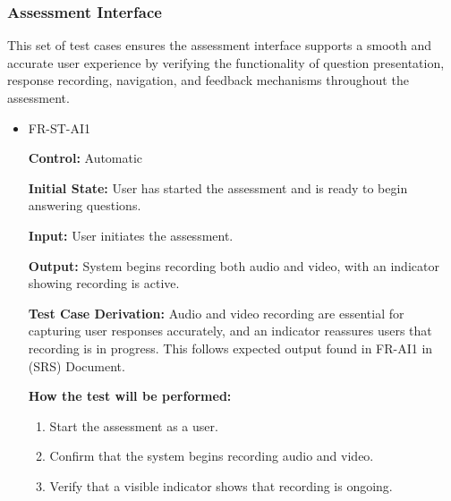 \documentclass[12pt, titlepage]{article}
\begin{document}
\subsubsection{Assessment Interface}

\hspace{2em}This set of test cases ensures the assessment interface supports a smooth and accurate user experience by verifying the 
functionality of question presentation, response recording, navigation, and feedback mechanisms throughout the assessment.

\begin{itemize}
  \item FR-ST-AI1
    \begin{mdframed}[linewidth=0.5mm]
      \textbf{Control:} Automatic \par
      \textbf{Initial State:} User has started the assessment and is ready to begin answering questions. \par
      \textbf{Input:} User initiates the assessment. \par
      \textbf{Output:} System begins recording both audio and video, with an indicator showing recording is active. \par
      \textbf{Test Case Derivation:} Audio and video recording are essential for capturing user responses accurately,
       and an indicator reassures users that recording is in progress. This follows expected output found in FR-AI1 in (SRS) Document. \par
      \textbf{How the test will be performed:}
      \begin{enumerate}[noitemsep]
        \item Start the assessment as a user.
        \item Confirm that the system begins recording audio and video.
        \item Verify that a visible indicator shows that recording is ongoing.
      \end{enumerate}
    \end{mdframed}


\end{itemize}
\end{document}
